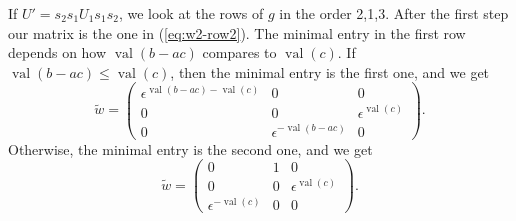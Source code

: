\documentclass{amsart}
\theoremstyle{definition}
\def\e{\epsilon}
\def\w{\widetilde{w}}
\def\val{\mathop{\mathrm{val}}}
\begin{document}
  If $U' = s_2s_1 U_1 s_1s_2$, we look at the rows of $g$ in the order 2,1,3.
  After the first step our matrix is the one in (\ref{eq:w2-row2}).  The
  minimal entry in the first row depends on how $\val(b-ac)$ compares to
  $\val(c)$.  If $\val(b-ac) \le \val(c)$, then the minimal entry is the first
  one, and we get
  \begin{equation*}
    \w = \begin{pmatrix}
      \e^{\val(b-ac)-\val(c)} & 0 & 0 \\
      0 & 0 & \e^{\val(c)} \\
      0 & \e^{-\val(b-ac)} & 0
    \end{pmatrix}.
  \end{equation*}
  Otherwise, the minimal entry is the second one, and we get
  \begin{equation*}
    \w = \begin{pmatrix}
      0 & 1 & 0 \\
      0 & 0 & \e^{\val(c)} \\
      \e^{-\val(c)} & 0 & 0
    \end{pmatrix}.
  \end{equation*}
\end{document}
